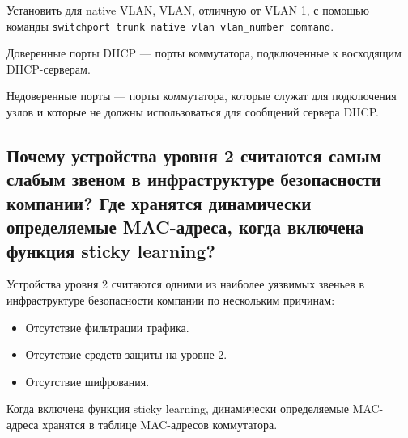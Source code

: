 Установить для native VLAN, VLAN, отличную от VLAN 1, с помощью
команды \verb|switchport trunk native vlan vlan_number command|.\par
Доверенные порты DHCP --- порты коммутатора, подключенные
к восходящим DHCP-серверам.\par
Недоверенные порты --- порты коммутатора, которые служат для
подключения узлов и которые не должны использоваться для
сообщений сервера DHCP.

\subsection{Почему устройства уровня 2 считаются самым слабым звеном в
инфраструктуре безопасности компании? Где хранятся
динамически определяемые MAC-адреса, когда включена
функция sticky learning?}

Устройства уровня 2 считаются одними из наиболее уязвимых звеньев
в инфраструктуре безопасности компании по нескольким причинам:

\begin{itemize}
    \item Отсутствие фильтрации трафика.
    \item Отсутствие средств защиты на уровне 2.
    \item Отсутствие шифрования.
\end{itemize}

Когда включена функция sticky learning, динамически определяемые
MAC-адреса хранятся в таблице MAC-адресов коммутатора.